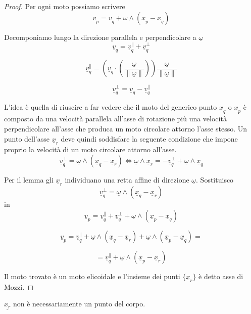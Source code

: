 \begin{proof}
Per ogni moto possiamo scrivere
\[
\underline{v}_p=\underline{v}_q+\underline{\omega}\wedge(\underline{x}_p-\underline{x}_q)
\]

Decomponiamo lungo la direzione parallela e perpendicolare a $\underline{\omega}$
\[
\underline{v}_q=\underline{v}_q^{\parallel}+\underline{v}_q^{\perp}
\]

\[
\underline{v}_q^{\parallel}
=
\left(
\underline{v}_q\cdot
\left(
\frac{\underline{\omega}}{\|\underline{\omega}\|}
\right)
\right)
\frac{\underline{\omega}}{\|\underline{\omega}\|}
\]

\[
\underline{v}_q^{\perp}=\underline{v}_q-\underline{v}_q^{\parallel}
\]

L'idea è quella di riuscire a far vedere che il moto del generico punto $\underline{x}_q$ o $\underline{x}_p$ è composto da una velocità parallela all'asse di rotazione più una velocità perpendicolare all'asse che produca un moto circolare attorno l'asse stesso. Un punto dell'asse  $\underline{x}_r$ deve quindi soddisfare la seguente condizione che impone proprio la velocità di un moto circolare attorno all'asse.
\[
\underline{v}_q^{\perp}
=
\underline{\omega}\wedge(\underline{x}_q-\underline{x}_r)
\iff
\underline{\omega}\wedge \underline{x}_r
=
-\underline{v}_q^{\perp}
+
\underline{\omega}\wedge \underline{x}_q
\]

Per il lemma gli $\underline{x}_r$ individuano una retta affine di direzione $\underline{\omega}$. Sostituisco
\[
\underline{v}_q^{\perp}
=
\underline{\omega}\wedge(\underline{x}_q-\underline{x}_r)
\]
in
\[
\underline{v}_p=\underline{v}_q^{\parallel}+\underline{v}_q^{\perp}+\underline{\omega}\wedge(\underline{x}_p-\underline{x}_q)
\]

\[
\underline{v}_p
=
\underline{v}_q^{\parallel}
+
\underline{\omega}\wedge(\underline{x}_q-\underline{x}_r)
+
\underline{\omega}\wedge(\underline{x}_p-\underline{x}_q)
=
\]

\[
=
\underline{v}_q^{\parallel}
+
\underline{\omega}\wedge(\underline{x}_p-\underline{x}_r)
\]

Il moto trovato è un moto elicoidale e l'insieme dei punti $\{\underline{x}_r\}$ è detto asse di Mozzi.
\end{proof}
\begin{oss}{}
    $\underline{x_r}$ non è necessariamente un punto del corpo.
\end{oss}
